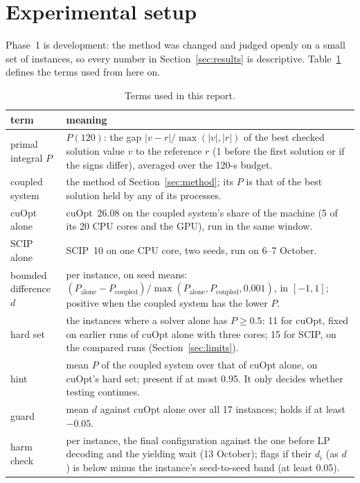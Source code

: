 \section{Experimental setup}\label{sec:setup}
Phase~1 is development: the method was changed and judged openly on a small set of instances, so every number in
Section~\ref{sec:results} is descriptive. Table~\ref{tab:terms} defines the terms used from here on.

\begin{table}[t]\centering\footnotesize
\caption{Terms used in this report.}\label{tab:terms}
\begin{tabular}{>{\raggedright}p{2.6cm}>{\raggedright\arraybackslash}p{13.0cm}}
\toprule
term & meaning \\
\midrule
primal integral $P$ & $P(120)$: the gap $|v-r|/\max(|v|,|r|)$ of the best checked solution value $v$ to the reference
  $r$ (1 before the first solution or if the signs differ), averaged over the 120-s budget. \\
coupled system & the method of Section~\ref{sec:method}; its $P$ is that of the best solution held by any of its
  processes. \\
cuOpt alone & cuOpt~26.08 on the coupled system's share of the machine (5 of its 20 CPU cores and the GPU), run in
  the same window. \\
SCIP alone & SCIP~10 on one CPU core, two seeds, run on 6--7 October. \\
bounded difference $d$ & per instance, on seed means: $(P_\text{alone} - P_\text{coupled}) / \max(P_\text{alone},
  P_\text{coupled}, 0.001)$, in $[-1, 1]$; positive when the coupled system has the lower $P$. \\
hard set & the instances where a solver alone has $P \ge 0.5$: 11 for cuOpt, fixed on earlier runs of cuOpt alone
  with three cores; 15 for SCIP, on the compared runs (Section~\ref{sec:limits}). \\
hint & mean $P$ of the coupled system over that of cuOpt alone, on cuOpt's hard set; present if at most 0.95. It only
  decides whether testing continues. \\
guard & mean $d$ against cuOpt alone over all 17 instances; holds if at least $-0.05$. \\
harm check & per instance, the final configuration against the one before LP decoding and the yielding wait (13
  October); flags if their $d_i$ (as $d$) is below minus the instance's seed-to-seed band (at least 0.05). \\
\bottomrule
\end{tabular}
\end{table}

